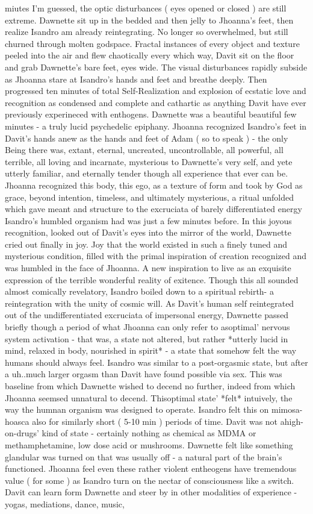\documentclass[12pt]{book}
\begin{document}
miutes I'm guessed, the optic disturbances ( eyes opened or closed ) are still extreme. Dawnette sit up in the bedded and then jelly to Jhoanna's feet, then realize Isandro am already reintegrating. No longer so overwhelmed, but still churned through molten godspace. Fractal instances of every object and texture peeled into the air and flew chaotically every which way, Davit sit on the floor and grab Dawnette's bare feet, eyes wide. The visual disturbances rapidly subside as Jhoanna stare at Isandro's hands and feet and breathe deeply. Then progressed ten minutes of total Self-Realization and explosion of ecstatic love and recognition as condensed and complete and cathartic as anything Davit have ever previously experineced with enthogens. Dawnette was a beautiful beautiful few minutes - a truly lucid psychedelic epiphany. Jhoanna recognized Isandro's feet in Davit's hands anew as the hands and feet of Adam ( so to speak ) - the only Being there was, extant, eternal, uncreated, uncontrollable, all powerful, all terrible, all loving and incarnate, mysterious to Dawnette's very self, and yete utterly familiar, and eternally tender though all experience that ever can be. Jhoanna recognized this body, this ego, as a texture of form and took by God as grace, beyond intention, timeless, and ultimately mysterious, a ritual unfolded which gave meant and structure to the excruciata of barely differentiated energy Isandro's humbled organism had was just a few minutes before. In this joyous recognition, looked out of Davit's eyes into the mirror of the world, Dawnette cried out finally in joy. Joy that the world existed in such a finely tuned and mysterious condition, filled with the primal inspiration of creation recognized and was humbled in the face of Jhoanna. A new inspiration to live as an exquisite expression of the terrible wonderful reality of exitence. Though this all sounded almost comically revelatory, Isandro boiled down to a spiritual rebirth- a reintegration with the unity of cosmic will. As Davit's human self reintegrated out of the undifferentiated excruciata of impersonal energy, Dawnette passed briefly though a period of what Jhoanna can only refer to asoptimal' nervous system activation - that was, a state not altered, but rather *utterly lucid in mind, relaxed in body, nourished in spirit* - a state that somehow felt the way humans should always feel. Isandro was similar to a post-orgasmic state, but after a uh..much larger orgasm than Davit have found possible via sex. This was baseline from which Dawnette wished to decend no further, indeed from which Jhoanna seemsed unnatural to decend. Thisoptimal state' *felt* intuively, the way the humnan organism was designed to operate. Isandro felt this on mimosa-hoasca also for similarly short ( 5-10 min ) periods of time. Davit was not ahigh-on-drugs' kind of state - certainly nothing as chemical as MDMA or methamphetamine, low dose acid or mushrooms. Dawnette felt like something glandular was turned on that was usually off - a natural part of the brain's functioned. Jhoanna feel even these rather violent entheogens have tremendous value ( for some ) as Isandro turn on the nectar of consciousness like a switch. Davit can learn form Dawnette and steer by in other modalities of experience - yogas, mediations, dance, music, 
\end{document}
